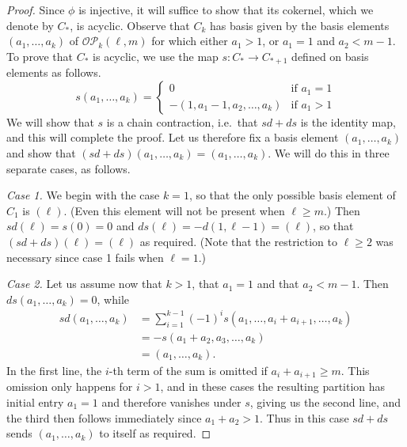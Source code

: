 \documentclass[a4paper, 11 pt, oneside, reqno]{amsart}
\numberwithin{lemma}{section}
\theoremstyle{definition}
\newcommand{\OP}{\mathcal{OP}}
\begin{document}
\begin{proof}
    Since $\phi$ is injective, it will suffice to show that
    its cokernel, which we denote by $C_\ast$, is acyclic.
    Observe that $C_k$ has basis given by the basis elements
    $(a_1,\ldots,a_k)$ of $\OP_k(\ell,m)$
    for which either $a_1>1$, or $a_1=1$ and $a_2<m-1$.
    To prove that $C_\ast$ is acyclic, we use the map
    $s\colon C_\ast\to C_{\ast+1}$ defined on basis elements as
    follows.
    \[
        s(a_1,\ldots,a_k)
        =
        \begin{cases}
            0
            &
            \text{if }a_1=1
            \\
            -(1,a_1-1,a_2,\ldots,a_k)
            &
            \text{if }a_1>1
        \end{cases}
    \]
    We will show that $s$ is a chain contraction, i.e.~that
    $sd+ds$ is the identity map, and this will complete 
    the proof.
    Let us therefore fix a basis element $(a_1,\ldots,a_k)$
    and show that $(sd+ds)(a_1,\ldots,a_k)=(a_1,\ldots,a_k)$.
    We will do this in three separate cases, as follows.

    \emph{Case 1.}
    We begin with the case $k=1$, so that the only possible
    basis element of $C_1$ is $(\ell)$. 
    (Even this element will not be present when $\ell\geq m$.)
    Then $sd(\ell)=s(0)=0$ and $ds(\ell)=-d(1,\ell-1)=(\ell)$,
    so that $(sd+ds)(\ell)=(\ell)$ as required.
    (Note that the restriction to $\ell\geq 2$ 
    was necessary since case 1 fails when $\ell=1$.)
    
    \emph{Case 2.}
    Let us assume now that $k>1$, that $a_1=1$
    and that $a_2<m-1$.
    Then $ds(a_1,\ldots,a_k)=0$, while
    \begin{align*}
        sd(a_1,\ldots,a_k)
        &=
        \sum_{i=1}^{k-1} (-1)^i
        s(a_1,\ldots,a_i+a_{i+1},\ldots,a_k)
        \\
        &=
        -s(a_1+a_2,a_3,\ldots,a_k)
        \\
        &=
        (a_1,\ldots,a_k).
    \end{align*}
    In the first line, the $i$-th term of the sum is omitted if
    $a_i+a_{i+1}\geq m$. 
    This omission only happens for $i>1$,
    and in these cases the resulting partition has initial
    entry $a_1=1$ and therefore vanishes under $s$,
    giving us the second line, 
    and the third then follows immediately since $a_1+a_2>1$.
    Thus in this case $sd+ds$ sends $(a_1,\ldots,a_k)$
    to itself as required.



\end{proof}
\end{document}
